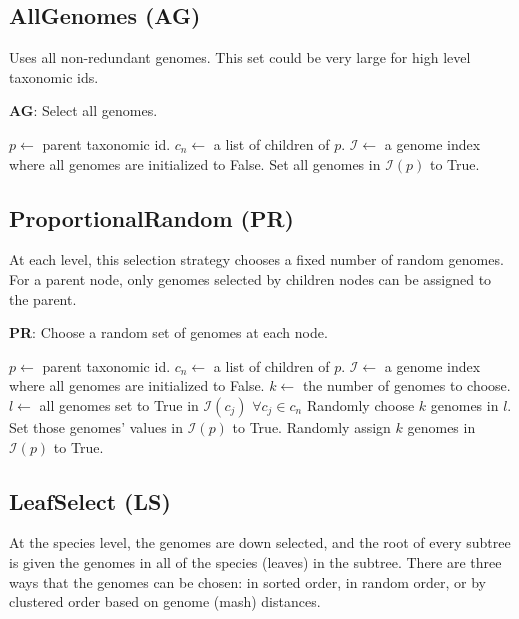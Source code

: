 \documentclass[12pt, letterpaper]{article}
\begin{document}
\newpage

\subsection{AllGenomes (AG)}
Uses all non-redundant genomes.  This set could be very large for high level taxonomic ids.

\begin{algorithm}[h!]
\caption{\textbf{AG}: Select all genomes.}
\label{AG}
\begin{algorithmic}[1]
\State $p \gets$ parent taxonomic id.
\State $c_n \gets$ a list of children of $p$.
\State $\mathcal{I} \gets$ a genome index where all genomes are initialized to False.
\State Set all genomes in $\mathcal{I}(p)$ to True.
\EndProcedure
\end{algorithmic}
\end{algorithm}

\newpage

\subsection{ProportionalRandom (PR)}
At each level, this selection strategy chooses a fixed number of random genomes.  For a parent node, only genomes selected by children nodes can be assigned to the parent.

\begin{algorithm}[h!]
\caption{\textbf{PR}: Choose a random set of genomes at each node.}
\label{PR}
\begin{algorithmic}
\State $p \gets$ parent taxonomic id.
\State $c_n \gets$ a list of children of $p$.
\State $\mathcal{I} \gets$ a genome index where all genomes are initialized to False.
\State $k \gets$ the number of genomes to choose.
 
\State $l \gets$ all genomes set to True in $\mathcal{I}(c_j)$ $\forall c_j \in c_n$ 
\State Randomly choose $k$ genomes in $l$.
\State Set those genomes' values in $\mathcal{I}(p)$ to True.
\Else {}
\State Randomly assign $k$ genomes in $\mathcal{I}(p)$ to True.
\EndIf
\EndProcedure
\end{algorithmic}
\end{algorithm}

\newpage

\subsection{LeafSelect (LS)}
At the species level, the genomes are down selected, and the root of every subtree is given the genomes in all of the species (leaves) in the subtree.  There are three ways that the genomes can be chosen: in sorted order, in random order, or by clustered order based on genome (mash) distances.
\end{document}
